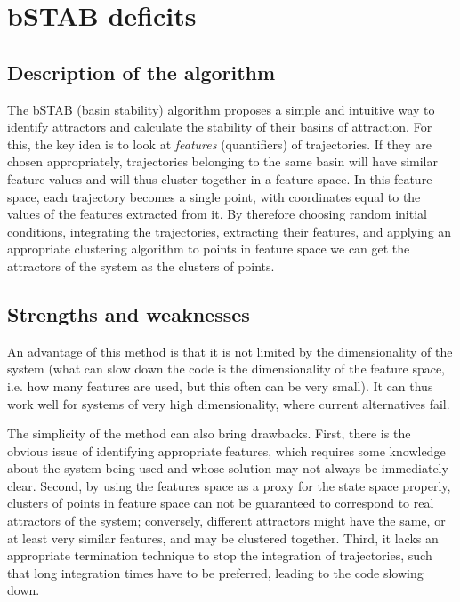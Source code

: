\documentclass{article}
\begin{document}
\section{bSTAB deficits}
\subsection{Description of the algorithm}
The bSTAB (basin stability) \cite{stender2021bstab} algorithm proposes a simple and intuitive way to identify attractors and calculate the stability of their basins of attraction. For this, the key idea is to look at \textit{features} (quantifiers) of trajectories. If they are chosen appropriately, trajectories belonging to the same basin will have similar feature values and will thus cluster together in a feature space. In this feature space, each trajectory becomes a single point, with coordinates equal to the values of the features extracted from it. By therefore choosing random initial conditions, integrating the trajectories, extracting their features, and applying an appropriate clustering algorithm to points in feature space we can get the attractors of the system as the clusters of points.

\subsection{Strengths and weaknesses}
An advantage of this method is that it is not limited by the dimensionality of the system (what can slow down the code is the dimensionality of the feature space, i.e. how many features are used, but this often can be very small). It can thus work well for systems of very high dimensionality, where current alternatives fail.

The simplicity of the method can also bring drawbacks. First, there is the obvious issue of identifying appropriate features, which requires some knowledge about the system being used and whose solution may not always be immediately clear. Second, by using the features space as a proxy for the state space properly, clusters of points in feature space can not be guaranteed to correspond to real attractors of the system; conversely, different attractors might have the same, or at least very similar features, and may be clustered together. Third, it lacks an appropriate termination technique to stop the integration of trajectories, such that long integration times have to be preferred, leading to the code slowing down.
\end{document}
